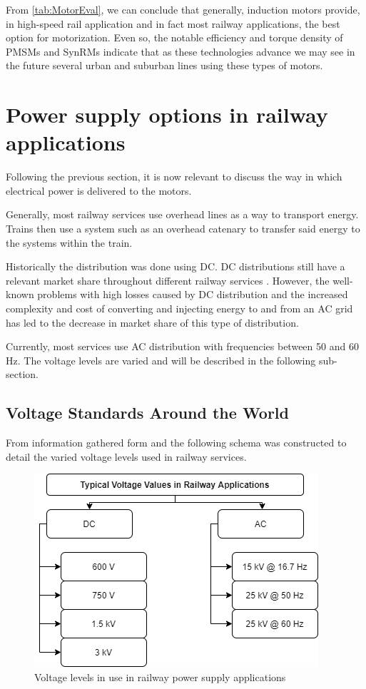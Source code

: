From \ref{tab:MotorEval}, we can conclude that generally, induction motors provide, in high-speed rail application and in fact most railway applications, the best option for motorization. Even so, the notable efficiency and torque density of PMSMs and SynRMs indicate that as these technologies advance we may see in the future several urban and suburban lines using these types of motors.


\section{Power supply options in railway applications} \label{PowerSup} 
Following the previous section, it is now relevant to discuss the way in which electrical power is delivered to the motors.

Generally, most railway services use overhead lines as a way to transport energy. Trains then use a system such as an overhead catenary to transfer said energy to the systems within the train.

Historically the distribution was done using DC. DC distributions still have a relevant market share throughout different railway services \cite{OldSota}. However,  the well-known problems with high losses caused by DC distribution and the increased complexity and cost of converting and injecting energy to and from an AC grid has led to the decrease in market share of this type of distribution.

Currently, most services use AC distribution with frequencies between 50 and 60 Hz. The voltage levels are varied and will be described in the following sub-section.

\subsection{Voltage Standards Around the World}
From information gathered form \cite{OldSota} and \cite{MainSOTA} the following schema was constructed to detail the varied voltage levels used in railway services.
\begin{figure}[ht]
    \centering
    \includegraphics[scale = 0.5]{Figures/VoltageLevels.png}
    \caption{Voltage levels in use in railway power supply applications}
    \label{fig:Vlevels}
\end{figure}

